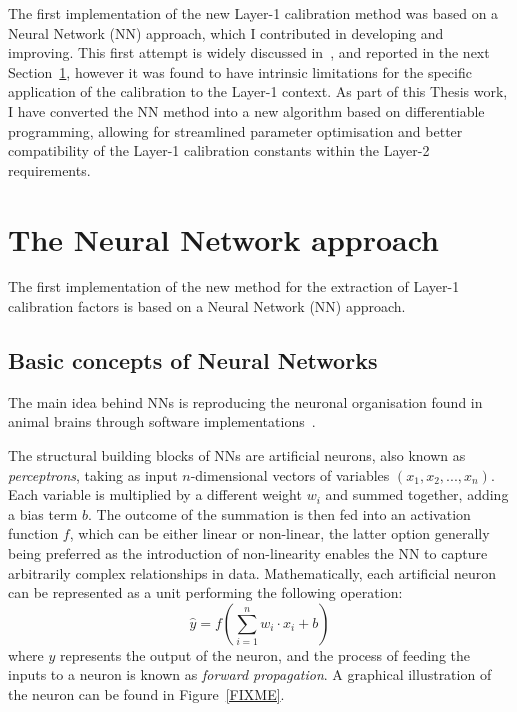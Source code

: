 \bigbreak

The first implementation of the new Layer-1 calibration method was based on a Neural Network (NN) approach, which I contributed in developing and improving. This first attempt is widely discussed in~\cite{Motta:2881939}, and reported in the next Section~\ref{sec:The Neural Network approach}, however it was found to have intrinsic limitations for the specific application of the calibration to the Layer-1 context. 
As part of this Thesis work, I have converted the NN method into a new algorithm based on differentiable programming, allowing for streamlined parameter optimisation and better compatibility of the Layer-1 calibration constants within the Layer-2 requirements.


\section{The Neural Network approach}
\label{sec:The Neural Network approach}

The first implementation of the new method for the extraction of Layer-1 calibration factors is based on a Neural Network (NN) approach. 

\subsection{Basic concepts of Neural Networks}

The main idea behind NNs is reproducing the neuronal organisation found in animal brains through software implementations~\cite{1672070}.

The structural building blocks of NNs are artificial neurons, also known as \textit{perceptrons}, taking as input $n$-dimensional vectors of variables $(x_1,x_2,...,x_n)$. Each variable is multiplied by a different weight $w_i$ and summed together, adding a bias term $b$.
The outcome of the summation is then fed into an activation function $f$, which can be either linear or non-linear, the latter option generally being preferred as the introduction of non-linearity enables the NN to capture arbitrarily complex relationships in data.
Mathematically, each artificial neuron can be represented as a unit performing the following operation:
\begin{equation}
    \hat{y}=f\left( \sum_{i=1}^{n}w_i \cdot x_i + b \right)
\end{equation}
where $y$ represents the output of the neuron, and the process of feeding the inputs to a neuron is known as \textit{forward propagation}. A graphical illustration of the neuron can be found in Figure~\ref{FIXME}.

